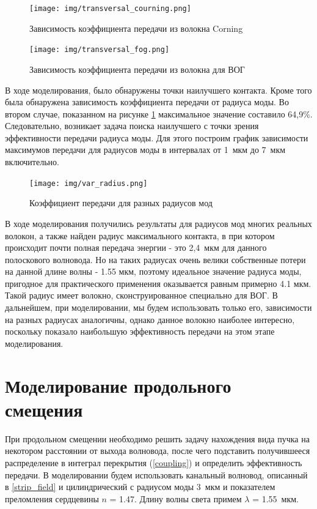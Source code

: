 \begin{figure}[h!]
		\texttt{[image: img/transversal\_courning.png]}
		\caption{Зависимость коэффициента передачи из волокна Corning}
\end{figure}
\begin{figure}[h!]
		\texttt{[image: img/transversal\_fog.png]}
		\caption{Зависимость коэффициента передачи из волокна для ВОГ}
		\label{transversal_fog}
\end{figure}

В ходе моделирования, было обнаружены точки наилучшего контакта. Кроме того была обнаружена зависимость коэффициента передачи от радиуса моды. Во втором случае, показанном на рисунке \ref{transversal_fog} максимальное значение составило 64,9\%. Следовательно, возникает задача поиска наилучшего с точки зрения эффективности передачи радиуса моды. Для этого построим график зависимости максимумов передачи для радиусов моды в интервалах от 1~мкм до 7~мкм включительно.
\begin{figure}[h!]
		\texttt{[image: img/var\_radius.png]}
		\caption{Коэффициент передачи для разных радиусов мод}
\end{figure}

В ходе моделирования получились результаты для радиусов мод многих реальных волокон, а также найден радиус максимального контакта, в при котором происходит почти полная передача энергии - это 2,4~мкм для данного полоскового волновода. Но на таких радиусах очень велики собственные потери на данной длине волны - 1.55 мкм, поэтому идеальное значение радиуса моды, пригодное для практического применения оказывается равным примерно 4.1 мкм. Такой радиус имеет волокно, сконструированное специально для ВОГ. В дальнейшем, при моделировании, мы будем использовать только его, зависимости на разных радиусах аналогичны, однако данное волокно наиболее интересно, поскольку показало наибольшую эффективность передачи на этом этапе моделирования.

\section{Моделирование продольного смещения}

При продольном смещении необходимо решить задачу нахождения вида пучка на некотором расстоянии от выхода волновода, после чего подставить получившееся распределение в интеграл перекрытия (\ref{coupling}) и определить эффективность передачи.
В моделировании будем использовать канальный волновод, описанный в \ref{strip_field} и цилиндрический с радиусом моды 3~мкм и показателем преломления сердцевины $n$ = 1.47. Длину волны света примем $\lambda$ = 1.55~мкм.

